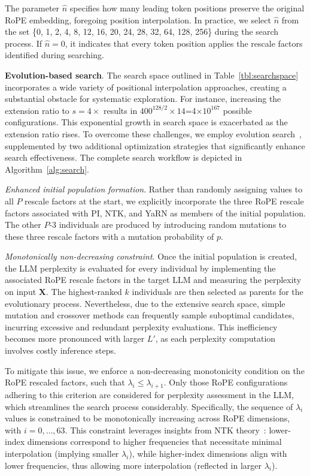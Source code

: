 The parameter $\hat{n}$ specifies how many leading token positions preserve the original RoPE embedding, foregoing position interpolation. In practice, we select $\hat{n}$ from the set \{0, 1, 2, 4, 8, 12, 16, 20, 24, 28, 32, 64, 128, 256\} during the search process. If $\hat{n}=0$, it indicates that every token position applies the rescale factors identified during searching.

\textbf{Evolution-based search}. The search space outlined in Table~\ref{tbl:searchspace} incorporates a wide variety of positional interpolation approaches, creating a substantial obstacle for systematic exploration. For instance, increasing the extension ratio to $s=4\times$ results in $400^{128/2}\times14$=4$\times10^{167}$ possible configurations. This exponential growth in search space is exacerbated as the extension ratio rises. To overcome these challenges, we employ evolution search~\cite{guo2020single}, supplemented by two additional optimization strategies that significantly enhance search effectiveness. The complete search workflow is depicted in Algorithm~\ref{alg:search}.

\textit{Enhanced initial population formation}. Rather than randomly assigning values to all $P$ rescale factors at the start, we explicitly incorporate the three RoPE rescale factors associated with PI, NTK, and YaRN as members of the initial population. The other $P$-3 individuals are produced by introducing random mutations to these three rescale factors with a mutation probability of $p$.

\textit{Monotonically non-decreasing constraint}. Once the initial population is created, the LLM perplexity is evaluated for every individual by implementing the associated RoPE rescale factors in the target LLM and measuring the perplexity on input $\mathbf{X}$. The highest-ranked $k$ individuals are then selected as parents for the evolutionary process. Nevertheless, due to the extensive search space, simple mutation and crossover methods can frequently sample suboptimal candidates, incurring excessive and redundant perplexity evaluations. This inefficiency becomes more pronounced with larger $L'$, as each perplexity computation involves costly inference steps.

To mitigate this issue, we enforce a non-decreasing monotonicity condition on the RoPE rescaled factors, such that $\lambda_i \leq \lambda_{i+1}$. Only those RoPE configurations adhering to this criterion are considered for perplexity assessment in the LLM, which streamlines the search process considerably. Specifically, the sequence of $\lambda_i$ values is constrained to be monotonically increasing across RoPE dimensions, with $i = 0, \ldots, 63$. This constraint leverages insights from NTK theory~\cite{jacot2018neural,tancik2020fourier,ntk}: lower-index dimensions correspond to higher frequencies that necessitate minimal interpolation (implying smaller $\lambda_i$), while higher-index dimensions align with lower frequencies, thus allowing more interpolation (reflected in larger $\lambda_i$).

